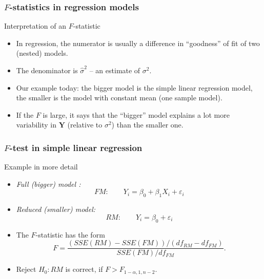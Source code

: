 \documentclass[handout]{beamer}
\begin{document}

   \begin{frame} \frametitle{$F$-statistics in regression models}

   \begin{block}
   {Interpretation of an $F$-statistic}

   \begin{itemize}

   \item In regression, the numerator is usually a difference in ``goodness'' of fit of two  (nested) models.

   \item The denominator is $\widehat{\sigma}^2$ -- an estimate of $\sigma^2$.

   \item Our example today: the bigger model is the simple linear regression model, the smaller is the model with constant mean (one sample model).

   \item If the $F$ is large, it says that the ``bigger''  model explains a lot more variability in $\pmb{Y}$  (relative to $\sigma^2$) than the smaller one.

   \end{itemize}
   \end{block}
   \end{frame}


   \begin{frame} \frametitle{$F$-test in simple linear regression}

   \begin{block}
   {Example in more detail}
   \begin{itemize}
   \item {\em Full (bigger) model :}
   $$
   FM: \qquad Y_i = \beta_0 + \beta_1 X_i + \varepsilon_i$$
   \item {\em Reduced (smaller) model:}
   $$
   RM: \qquad Y_i = \beta_0  + \varepsilon_i$$

   \item The $F$-statistic has the form
   $$
   F=\frac{(SSE(RM) - SSE(FM)) / (df_{RM} - df_{FM})}{SSE(FM) / df_{FM}}.$$
   \item Reject $H_0: RM$ is correct, if $F > F_{1-\alpha, 1, n-2}$.

   \end{itemize}
   \end{block}
   \end{frame}
\end{document}
